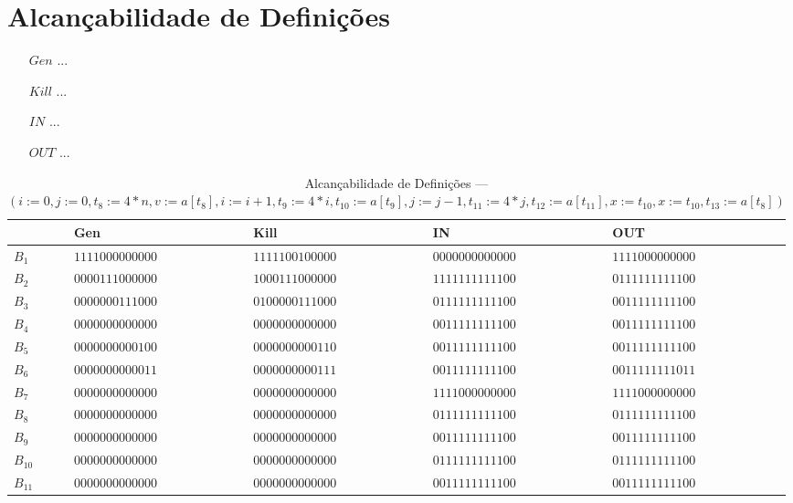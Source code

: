 \section{Alcan\c{c}abilidade de Defini\c{c}\~oes}

\begin{itemize}
  \item[$Gen$] ...
  \item[$Kill$] ...
  \item[$IN$] ...
  \item[$OUT$] ...
\end{itemize}

\begin{table}[ht]
\centering
\begin{tabular}{l|l|l|l|l}
	& Gen & Kill & IN & OUT\\
\hline
$B_{1}$ &  $1111000000000$ & $1111100100000$ & $0000000000000$ & $1111000000000$\\
$B_{2}$ &  $0000111000000$ & $1000111000000$ & $1111111111100$ & $0111111111100$\\
$B_{3}$ &  $0000000111000$ & $0100000111000$ & $0111111111100$ & $0011111111100$\\
$B_{4}$ &  $0000000000000$ & $0000000000000$ & $0011111111100$ & $0011111111100$\\
$B_{5}$ &  $0000000000100$ & $0000000000110$ & $0011111111100$ & $0011111111100$\\
$B_{6}$ &  $0000000000011$ & $0000000000111$ & $0011111111100$ & $0011111111011$\\
$B_{7}$ &  $0000000000000$ & $0000000000000$ & $1111000000000$ & $1111000000000$\\
$B_{8}$ &  $0000000000000$ & $0000000000000$ & $0111111111100$ & $0111111111100$\\
$B_{9}$ &  $0000000000000$ & $0000000000000$ & $0011111111100$ & $0011111111100$\\
$B_{10}$ &  $0000000000000$ & $0000000000000$ & $0111111111100$ & $0111111111100$\\
$B_{11}$ &  $0000000000000$ & $0000000000000$ & $0011111111100$ & $0011111111100$\\
\end{tabular}
\caption{Alcan\c{c}abilidade de Defini\c{c}\~oes --- $(i:=0, j:=0, t_{8}:=4*n, v:=a[t_{8}], i:=i+1, t_{9}:=4*i, t_{10}:=a[t_{9}], j:=j-1, t_{11}:=4*j, t_{12}:=a[t_{11}], x:=t_{10}, x:=t_{10}, t_{13}:=a[t_{8}])$}
\end{table}


